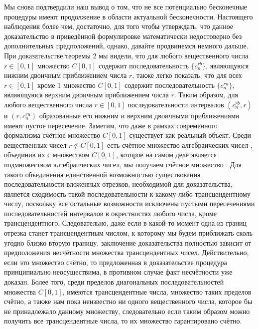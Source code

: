 \documentclass[12pt]{article}
\begin{document}
Мы снова подтвердили наш вывод о том, что не все потенциально бесконечные процедуры имеют продолжение в области актуальной бесконечности. Настоящего наблюдения более чем, достаточно, для того чтобы утверждать, что данное доказательство в приведённой формулировке математически недостоверно без дополнительных предположений, однако, давайте продвинемся немного дальше. При доказательстве теоремы 2 мы видели, что для любого вещественного числа $r \in [0, 1]$ множество $C[0, 1]$ содержит последовательность $\{c^{rb}_n\}$, являющуюся нижним двоичным приближением числа $r$, также легко показать, что для всех $r \in [0, 1]$ кроме 1 множество $C[0, 1]$ содержит последовательность $\{c^{ru}_n\}$, являющуюся верхним двоичным приближением числа $r$. Таким образом, для любого вещественного числа $r \in [0, 1]$ последовательности интервалов $(c^{rb}_n, r)$ и $(r, c^{ru}_n)$ образованные его нижним и верхним двоичными приближениями имеют пустое пересечение. Заметим, что даже в рамках современного формализма счётное множество $C[0, 1]$ существует как реальный объект. Среди вещественных чисел $r \notin C[0, 1]$ есть счётное множество алгебраических чисел \cite{matan-algebraic-numbers}, объединив их с множеством $C[0, 1]$, которое на самом деле является подмножеством алгебраических чисел, мы получаем счётное множество \cite{matan-countable-union}. Для такого объединения единственной возможностью существования последовательности вложенных отрезков, необходимой для доказательства, является сходимость такой последовательности к какому-либо трансцендентному числу, поскольку все остальные возможности исключены пустыми пересечениями последовательностей интервалов в окрестностях любого числа, кроме трансцендентного. Следовательно, даже если в какой-то момент одна из границ отрезка станет трансцендентным числом, к которому мы будем приближать сколь угодно близко вторую границу, заключение доказательства полностью зависит от предположения несчётности множества трансцендентных чисел. Действительно, если это множество счётно, то предложенная в доказательстве процедура принципиально неосуществима, в противном случае факт несчётности уже доказан. Более того, среди пределов диагональных последовательностей множества $C[0, 1]$, имеются трансцендентные числа, множество таких пределов счётно, а также нам пока неизвестно ни одного вещественного числа, которое бы не принадлежало данному множеству, следовательно если таким образом можно получить все трансцендентные числа, то их множество гарантировано счётно. 
\end{document}
